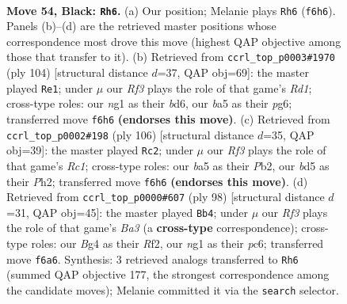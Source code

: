 \documentclass[11pt]{article}
\begin{document}
\clearpage

\begin{figure}[p]\centering
\begin{subfigure}{0.46\textwidth}\centering
\resizebox{\linewidth}{!}{%
\newchessgame
\chessboard[
  setfen={8/4k3/5r2/B2B4/P5bp/1PK2p2/5R2/6N1 b - - 3 54},
  showmover=false,
  pgfstyle=straightmove, color=movearrow, markmove={f6-h6}
]}
\caption{}
\end{subfigure}\hfill
\begin{subfigure}{0.46\textwidth}\centering
\resizebox{\linewidth}{!}{%
\newchessgame
\chessboard[
  setfen={5k2/8/3b2pp/8/KPr1pP2/8/3B2P1/3R4 w - - 4 53},
  showmover=false,
  pgfstyle=straightmove, color=movearrow, markmove={d1-e1}
]}
\caption{}
\end{subfigure}
\\[4pt]
\begin{subfigure}{0.46\textwidth}\centering
\resizebox{\linewidth}{!}{%
\newchessgame
\chessboard[
  setfen={8/4r2p/1kb3p1/8/p3P3/3BK3/1P5P/2R5 w - - 0 54},
  showmover=false,
  pgfstyle=straightmove, color=movearrow, markmove={c1-c2}
]}
\caption{}
\end{subfigure}\hfill
\begin{subfigure}{0.46\textwidth}\centering
\resizebox{\linewidth}{!}{%
\newchessgame
\chessboard[
  setfen={8/5pk1/2p2b2/8/3P3p/B2K4/P4R1P/r7 w - - 0 50},
  showmover=false,
  pgfstyle=straightmove, color=movearrow, markmove={a3-b4}
]}
\caption{}
\end{subfigure}
\caption{\textbf{Move 54, Black: \texttt{Rh6}.} (a) Our position; Melanie plays \texttt{Rh6} (\texttt{f6h6}). Panels (b)--(d) are the retrieved master positions whose correspondence most drove this move (highest QAP objective among those that transfer to it). (b) Retrieved from \texttt{ccrl\_top\_p0003\#1970} (ply 104) [structural distance $d$=37, QAP obj=69]: the master played \texttt{Re1}; under $\mu$ our \emph{Rf3} plays the role of that game's \emph{Rd1}; cross-type roles: our \emph{n}g1 as their \emph{b}d6, our \emph{b}a5 as their \emph{p}g6; transferred move \texttt{f6h6} \textbf{(endorses this move)}. (c) Retrieved from \texttt{ccrl\_top\_p0002\#198} (ply 106) [structural distance $d$=35, QAP obj=39]: the master played \texttt{Rc2}; under $\mu$ our \emph{Rf3} plays the role of that game's \emph{Rc1}; cross-type roles: our \emph{b}a5 as their \emph{P}b2, our \emph{b}d5 as their \emph{P}h2; transferred move \texttt{f6h6} \textbf{(endorses this move)}. (d) Retrieved from \texttt{ccrl\_top\_p0000\#607} (ply 98) [structural distance $d$=31, QAP obj=45]: the master played \texttt{Bb4}; under $\mu$ our \emph{Rf3} plays the role of that game's \emph{Ba3} (a \textbf{cross-type} correspondence); cross-type roles: our \emph{B}g4 as their \emph{R}f2, our \emph{n}g1 as their \emph{p}c6; transferred move \texttt{f6a6}. Synthesis: 3 retrieved analogs transferred to \texttt{Rh6} (summed QAP objective 177, the strongest correspondence among the candidate moves); Melanie committed it via the \texttt{search} selector.}
\label{fig:thought-m107}
\end{figure}
\end{document}
